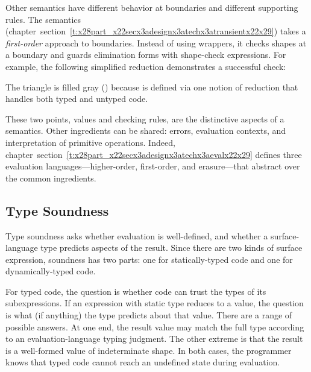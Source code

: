 \documentclass[ twoside,open=right,titlepage,numbers=noenddot,headinclude,%
                footinclude=true,cleardoublepage=empty,abstract=off,
                BCOR=5mm,paper=a4,fontsize=11pt,%
                ngerman,american,%
                parts,pdfspacing]{scrreprt}
\newcommand{\SecRef}[2]{section~#1}
\newcommand{\SecRefLocal}[3]{\hyperref[#1]{\SecRef{#2}{#3}}}
\newcommand{\Ssubsubsection}[2]{\subsubsection[#1]{#2}}
\renewcommand{\Ssubsubsection}[2]{\subsection[#1]{#2}}
\renewcommand{\SecRefLocal}[3]{section~\ref{#1}}
\begin{document}

\noindent{}Other semantics have different behavior at boundaries and
 different supporting rules.
The \relax{\tname} semantics (chapter~\SecRefLocal{t:x28part_x22secx3adesignx3atechx3atransientx22x29}{4.5.8}{\relax{\tname} and its Properties}) takes a \emph{first{-}order}
 approach to boundaries.
Instead of using wrappers, it checks shapes at a boundary and guards
 elimination forms with shape{-}check expressions.
For example, the following simplified reduction demonstrates a successful check:


\noindent{}The triangle is filled gray (\relax{$\nredXsym$}) because \relax{\tname} is defined
 via one notion of reduction that handles both typed and untyped code.

These two points, values and checking rules, are the distinctive aspects of
 a semantics.
Other ingredients can be shared:
 errors, evaluation contexts, and interpretation of primitive operations.
Indeed, chapter~\SecRefLocal{t:x28part_x22secx3adesignx3atechx3aevalx22x29}{4.5.2}{Three Evaluation Syntaxes} defines three evaluation
 languages{---}higher{-}order, first{-}order, and erasure{---}that abstract over the
 common ingredients.

\Ssubsubsection{Type Soundness}{Type Soundness}\label{t:x28part_x22secx3adesignx3abasicx3atsx22x29}

Type soundness asks whether evaluation is well{-}defined, and whether
  a surface{-}language type predicts aspects of the result.
Since there are two kinds of surface expression, soundness has two parts:
 one for statically{-}typed code and one for dynamically{-}typed code.

For typed code, the question is whether code can trust the
 types of its subexpressions.
If an expression with static type  reduces to a value,
 the question is what (if anything) the type  predicts about that value.
There are a range of possible answers.
At one end, the result value may match the full type  according
 to an evaluation{-}language typing judgment.
The other extreme is that the result is a well{-}formed value of indeterminate
 shape.
In both cases, the programmer knows that typed code cannot reach an undefined
 state during evaluation.
\end{document}
